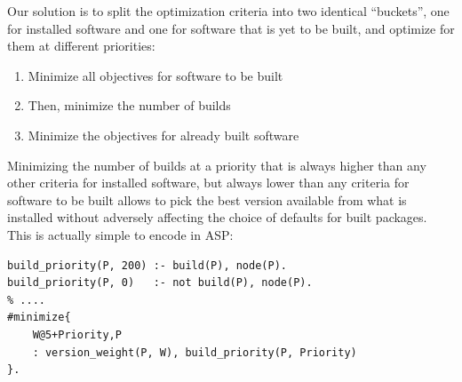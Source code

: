 

Our solution is to split the optimization criteria into two identical ``buckets'', one
for installed software and one for software that is yet to be built, and optimize for
them at different priorities:
\begin{enumerate}
\item Minimize all objectives for software to be built
\item Then, minimize the number of builds
\item Minimize the objectives for already built software
\end{enumerate}
Minimizing the number of builds at a priority that is always higher than any other
criteria for installed software, but always lower than any criteria for software to be
built allows \spack{} to pick the best version available from what is installed without
adversely affecting the choice of defaults for built packages. This is actually simple
to encode in ASP:

\begin{verbatim}
build_priority(P, 200) :- build(P), node(P).
build_priority(P, 0)   :- not build(P), node(P).
% ....
#minimize{
    W@5+Priority,P
    : version_weight(P, W), build_priority(P, Priority)
}.
\end{verbatim}

